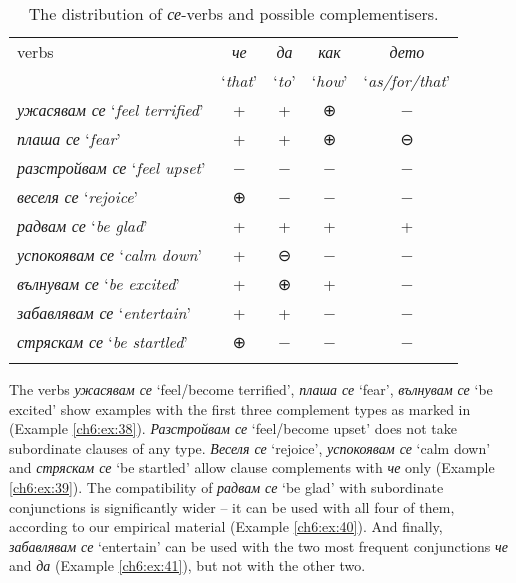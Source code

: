 \documentclass[output=paper,colorlinks,citecolor=brown]{langscibook}
\begin{document}
\begin{table}
    \begin{tabular}{ l *4{c} } 
    \lsptoprule
         verbs& \textit{че} &  \textit{да} &  \textit{как} & \textit{дето} \\
              & `\textit{that}' & `\textit{to}' & `\textit{how}' & `\textit{as/for/that}' \\ 
         \midrule
        \textit{ужасявам се} `\textit{feel terrified}'&  +&  +&  ⊕& −\\ 
        \textit{плаша се} `\textit{fear}'&  +&  +&  ⊕& ⊖\\ 
        \textit{разстройвам се} `\textit{feel upset}'&  −&  −&  −& −\\ 
        \textit{веселя се} `\textit{rejoice}'&  ⊕&  −&  −& −\\ 
        \textit{радвам се} `\textit{be glad}'&  +&  +&  +& +\\ 
        \textit{успокоявам се} `\textit{calm down}'&  +&  ⊖&  −& −\\ 
        \textit{вълнувам се} `\textit{be excited}'&  +&  ⊕&  +& −\\ 
        \textit{забавлявам се} `\textit{entertain}'&  +&  +&  −& −\\ 
        \textit{стряскам се} `\textit{be startled}'&  ⊕&  −&  −& −\\ 
      \lspbottomrule
    \end{tabular}
    \caption{The distribution of \textit{се}-verbs and possible complementisers.}
    \label{tab:distributionse}
\end{table}

The verbs \textit{ужасявам се} `feel/become terrified', \textit{плаша се} `fear', \textit{вълнувам се} `be excited' show examples with the first three complement types as marked in  (Example \ref{ch6:ex:38}). \textit{Разстройвам се} `feel/become upset' does not take subordinate clauses of any type. \textit{Веселя се} `rejoice', \textit{успокоявам се} `calm down' and \textit{стряскам се} `be startled' allow clause complements with \textit{че} only (Example \ref{ch6:ex:39}). The compatibility of \textit{радвам се} `be glad' with subordinate conjunctions is significantly wider -- it can be used with all four of them, according to our empirical material (Example \ref{ch6:ex:40}). And finally, \textit{забавлявам се} `entertain' can be used with the two most frequent conjunctions \textit{че} and \textit{да} (Example \ref{ch6:ex:41}), but not with the other two.
\end{document}

